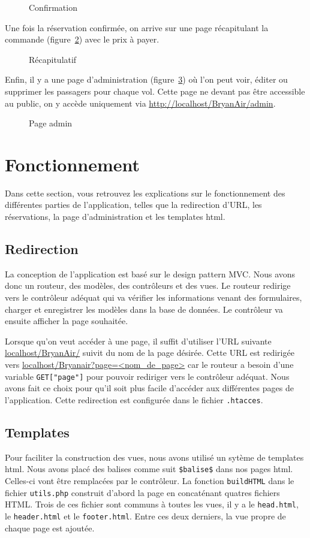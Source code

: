 \documentclass[12pt,a4paper]{article}
\begin{document}
		\begin{figure}
			\caption{Confirmation}
			\label{fig:conf}
		\end{figure}
		Une fois la réservation confirmée, on arrive sur une page récapitulant la commande (figure~\ref{fig:recap}) avec le prix à payer.
		\begin{figure}
			\caption{Récapitulatif}
			\label{fig:recap}
		\end{figure}

		Enfin, il y a une page d'administration (figure~\ref{fig:admin}) où l'on peut voir, éditer ou supprimer les passagers pour chaque vol. Cette page ne devant pas être accessible au public, on y accède uniquement via \url{http://localhost/BryanAir/admin}.

		\begin{figure}
			\caption{Page admin}
			\label{fig:admin}
		\end{figure}

	\section{Fonctionnement}
		Dans cette section, vous retrouvez les explications sur le fonctionnement des différentes parties de l'application, telles que la redirection d'URL, les réservations, la page d'administration et les templates html.
		\subsection*{Redirection}
		La conception de l'application est basé sur le design pattern MVC. Nous avons donc un routeur, des modèles, des contrôleurs et des vues. Le routeur redirige vers le contrôleur adéquat qui va vérifier les informations venant des formulaires, charger et enregistrer les modèles dans la base de données. Le contrôleur va ensuite afficher la page souhaitée.

		Lorsque qu'on veut accéder à une page, il suffit d'utiliser l'URL suivante \url{localhost/BryanAir/} suivit du nom de la page désirée. Cette URL est redirigée vers \url{localhost/Bryanair?page=<nom_de_page>} car le routeur a besoin d'une variable \texttt{GET["page"]} pour pouvoir rediriger vers le contrôleur adéquat. Nous avons fait ce choix pour qu'il soit plus facile d'accéder aux différentes pages de l'application. Cette redirection est configurée dans le fichier \texttt{.htacces}.

		\subsection*{Templates}
		Pour faciliter la construction des vues, nous avons utilisé un sytème de templates html. Nous avons placé des balises comme suit \texttt{\$balise\$} dans nos pages html. Celles-ci vont être remplacées par le contrôleur. La fonction \texttt{buildHTML} dans le fichier \texttt{utils.php} construit d'abord la page en concaténant quatres fichiers HTML. Trois de ces fichier sont communs à toutes les vues, il y a le \texttt{head.html}, le \texttt{header.html} et le \texttt{footer.html}. Entre ces deux derniers, la vue propre de chaque page est ajoutée.
		
\end{document}
